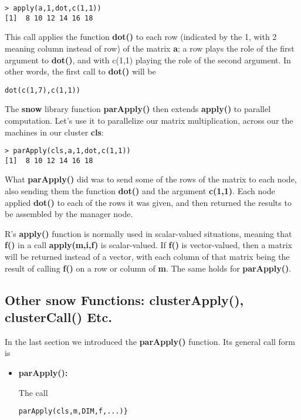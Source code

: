 \begin{lstlisting}
> apply(a,1,dot,c(1,1))
[1]  8 10 12 14 16 18
\end{lstlisting}

This call applies the function {\bf dot()} to each row (indicated by the
1, with 2 meaning column instead of row) of the matrix {\bf a}; a row
plays the role of the first argument to {\bf dot()}, and with c(1,1)
playing the role of the second argument.  In other words, the first call
to {\bf dot()} will be

\begin{lstlisting}
dot(c(1,7),c(1,1))
\end{lstlisting}

The {\bf snow} library function {\bf parApply()} then extends {\bf
apply()} to parallel computation.  Let's use it to parallelize our
matrix multiplication, across our the machines in our cluster {\bf cls}:

\begin{lstlisting}
> parApply(cls,a,1,dot,c(1,1))
[1]  8 10 12 14 16 18
\end{lstlisting}

What {\bf parApply()} did was to send some of the rows of the matrix to
each node, also sending them the function {\bf dot()} and the argument
{\bf c(1,1)}.  Each node applied {\bf dot()} to each of the rows it was
given, and then returned the results to be assembled by the manager node.

R's {\bf apply()} function is normally used in scalar-valued situations,
meaning that {\bf f()} in a call {\bf apply(m,i,f)} is scalar-valued.
If {\bf f()} is vector-valued, then a matrix will be returned instead of
a vector, with each column of that matrix being the result of calling
{\bf f()} on a row or column of {\bf m}.  The same holds for {\bf
parApply()}.

\subsection{Other snow Functions:  clusterApply(), clusterCall() Etc.}

In the last section we introduced the {\bf parApply()} function.  Its
general call form is

\begin{itemize}

\item {\bf parApply():}

The call

\begin{lstlisting}
parApply(cls,m,DIM,f,...)}
\end{lstlisting}

\end{itemize}


